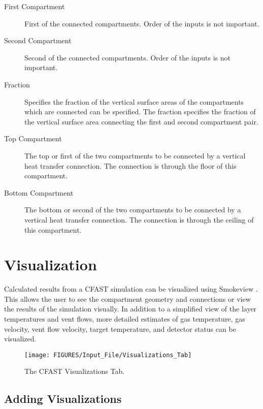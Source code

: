 \begin{description}
\item[First Compartment] First of the connected compartments. Order of the inputs is not important.

\item[Second Compartment] Second of the connected compartments. Order of the inputs is not important.

\item[Fraction] Specifies the fraction of the vertical surface areas of the compartments which are connected can be specified. The fraction specifies the fraction of the vertical surface area connecting the first and second compartment pair.

\item[Top Compartment] The top or first of the two compartments to be connected by a vertical heat transfer connection. The connection is through the floor of this compartment.

\item[Bottom Compartment] The bottom or second of the two compartments to be connected by a vertical heat transfer connection. The connection is through the ceiling of this compartment.
\end{description}





\chapter{Visualization}

Calculated results from a CFAST simulation can be visualized using Smokeview \cite{Smokeview_Users_Guide_6}. This allows the user to see the compartment geometry and connections or view the results of the simulation visually. In addition to a simplified view of the layer temperatures and vent flows, more detailed estimates of gas temperature, gas velocity, vent flow velocity, target temperature, and detector status can be visualized.

\begin{figure}[h!]
\begin{center}
\texttt{[image: FIGURES/Input\_File/Visualizations\_Tab]}
\caption[The CFAST Visualizations Tab]{The CFAST Visualizations Tab.}
\end{center}
\end{figure}

\section{Adding Visualizations}

